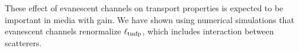 These effect of evanescent channels on transport properties is expected to be important in media with gain. We have shown using numerical simulations that evanescent channels renormalize $\ell_{\rm tmfp}$, which includes interaction between scatterers. 

%
% 
% 
% 
% 
% 
% 
% 
% 
% 
% 
% 
% 
% 
% 
% 


%
